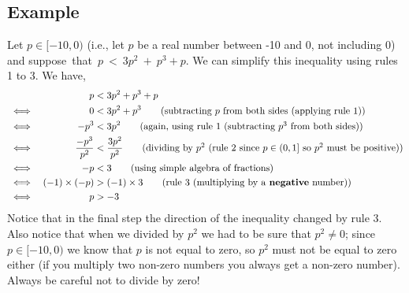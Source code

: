 \subsection{Example}
Let $p \in [-10,0)$ (i.e., let $p$ be a real number between -10 and 0, not including 0) and suppose~that~$p~<~3p^2~+~p^3 + p.$ We can simplify this inequality using rules 1 to 3. We have,
\begin{alignat*}{2}
&& p
& < 3p^2 + p^3 + p \\
&\iff 
& 0 
& < 3p^2 + p^3 \tag{subtracting $p$ from both sides (applying rule 1)} \\
&\iff 
& -p^3 
& < 3p^2 \tag{again, using rule 1 (subtracting $p^3$ from both sides)} \\
& \iff 
& \frac{-p^3}{p^2} 
& < \frac{3p^2}{p^2} \tag{dividing by $p^2$ (rule 2 since $p \in (0,1]$ so $p^2$ must be positive)} \\
& \iff
& -p 
& < 3 \tag{using simple algebra of fractions} \\
& \iff
& (-1)\times(-p) 
& > (-1)\times3 \tag{rule 3 (multiplying by a \textbf{negative} number)} \\
& \iff
& p
& > -3
\end{alignat*}
Notice that in the final step the direction of the inequality changed by rule 3. Also notice that when we divided by $p^2$ we had to be sure that $p^2 \neq 0$; since $p \in [-10,0)$ we know that $p$ is not equal to zero, so $p^2$ must not be equal to zero either (if you multiply two non-zero numbers you always get a non-zero number). Always be careful not to divide by zero!

